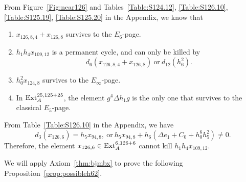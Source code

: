 From Figure~\ref{Fig:near126} and Tables~\ref{Table:S124.12}, \ref{Table:S126.10}, \ref{Table:S125.19}, \ref{Table:S125.20} in the Appendix, we know that
\begin{axiom} \label{fact:theta5sqAF}
\begin{enumerate}
    \item $x_{126,8,4} + x_{126,8}$ survives to the $E_6$-page.
    
    \item $h_1h_4x_{109,12}$ is a permanent cycle, and can only be killed by 
    $$d_6(x_{126,8,4} + x_{126,8}) \ \text{or} \ d_{12}(h_6^2).$$
    
    \item $h_0^2x_{124,8}$ survives to the $E_\infty$-page.

    \item In $\mathrm{Ext}_A^{25,125+25}$, the element $g^4\Delta h_1g$ is the only one that survives to the classical $E_5$-page.
\end{enumerate}\end{axiom}

\begin{remark}
From Table~\ref{Table:S126.10} in the Appendix, we have
   $$d_3(x_{126,6}) = h_5x_{94,8}, \ \text{or} \ h_5x_{94,8} + h_6(\Delta e_1 + C_0 + h_0^6h_5^2) \neq 0.$$
   Therefore, the element $x_{126,6} \in \mathrm{Ext}_A^{6, 126+6}$ cannot kill $h_1h_4x_{109,12}$.
\end{remark}

We will apply Axiom~\ref{thm:bjmbx} to prove the following Proposition~\ref{prop:possibleh62}.


